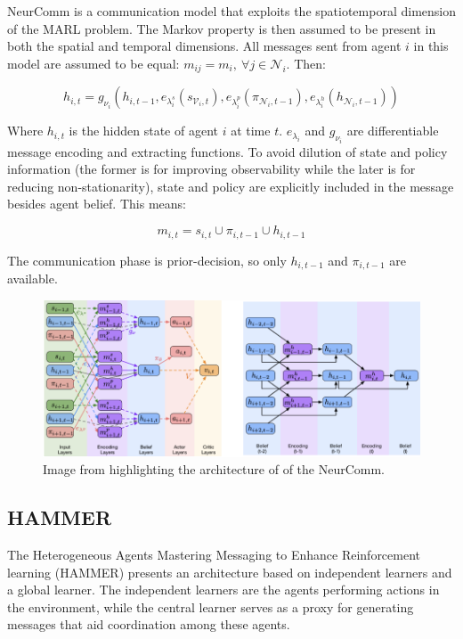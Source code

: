 \documentclass{article}
\begin{document}
NeurComm \citep{chu2020NeurComm} is a communication model that exploits the spatiotemporal dimension of the MARL problem. The Markov property is then assumed to be present in both the spatial and temporal dimensions. All messages sent from agent $i$ in this model are assumed to be equal: $m_{ij} = m_i, \ \forall j \in \mathcal{N}_i$. Then:

\begin{equation}
	h_{i, t} = g_{\nu_i} (h_{i, t-1}, e_{\lambda_i^s}(s_{\mathcal{V}_i, t}), e_{\lambda_i^p}(\pi_{\mathcal{N}_i, t-1}), e_{\lambda_i^h}(h_{\mathcal{N}_i, t-1}))
\end{equation}

Where $h_{i, t}$ is the hidden state of agent $i$ at time $t$. $e_{\lambda_i}$ and $g_{\nu_i}$ are differentiable message encoding and extracting functions. To avoid dilution of state and policy information (the former is for improving observability while the later is for reducing non-stationarity), state and policy are explicitly included in the message besides agent belief. This means:

\begin{equation}
	m_{i,t} = s_{i,t} \cup \pi_{i,t−1} \cup h_{i,t−1}
\end{equation}

The communication phase is prior-decision, so only $h_{i,t−1}$ and $\pi_{i,t−1}$ are available.

\begin{figure}
	\centering
	\includegraphics[scale=0.5]{images/neurcomm}
	\caption{Image from \citet{chu2020NeurComm} highlighting the architecture of of the NeurComm.}
	\label{fig:neurcomm}
\end{figure}

\subsection{HAMMER}

The Heterogeneous Agents Mastering Messaging to Enhance Reinforcement learning (HAMMER) \citep{gupta2022HAMMER} presents an architecture based on independent learners and a global learner. The independent learners are the agents performing actions in the environment, while the central learner serves as a proxy for generating messages that aid coordination among these agents.
\end{document}
